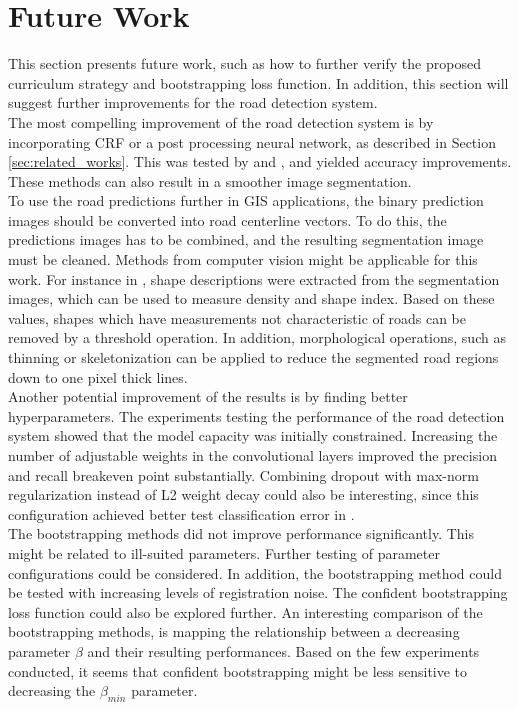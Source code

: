 \section{Future Work}
\label{sec:futureWork}
This section presents future work, such as how to further verify the proposed curriculum strategy and bootstrapping loss function. In addition, this section will suggest further improvements for the road detection system.\\

The most compelling improvement of the road detection system is by incorporating \ac{CRF} or a post processing neural network, as described in Section \ref{sec:related_works}. This was tested by \cite{Kluckner_semantic_height} and \cite{Mnih_aerial_images_noisy}, and yielded accuracy improvements. These methods can also result in a smoother image segmentation. \\

To use the road predictions further in GIS applications, the binary prediction images should be converted into road centerline vectors. To do this, the predictions images has to be combined, and the resulting segmentation image must be cleaned. Methods from computer vision might be applicable for this work. For instance in \citep{Song_road_extraction_svm}, shape descriptions were extracted from the segmentation images, which can be used to measure density and shape index. Based on these values, shapes which have measurements not characteristic of roads can be removed by a threshold operation. In addition, morphological operations, such as thinning or skeletonization can be applied to reduce the segmented road regions down to one pixel thick lines.\\

Another potential improvement of the results is by finding better hyperparameters. The experiments testing the performance of the road detection system showed that the model capacity was initially constrained. Increasing the number of adjustable weights in the convolutional layers improved the precision and recall breakeven point substantially. Combining dropout with max-norm regularization instead of L2 weight decay could also be interesting, since this configuration achieved better test classification error in \citep{Srivastava_dropout}.\\

The bootstrapping methods did not improve performance significantly. This might be related to ill-suited parameters. Further testing of parameter configurations could be considered. In addition, the bootstrapping method could be tested with increasing levels of registration noise. The confident bootstrapping loss function could also be explored further. An interesting comparison of the bootstrapping methods, is mapping the relationship between a decreasing parameter $\beta$ and their resulting performances. Based on the few experiments conducted, it seems that confident bootstrapping might be less sensitive to decreasing the $\beta_{min}$ parameter.\\

